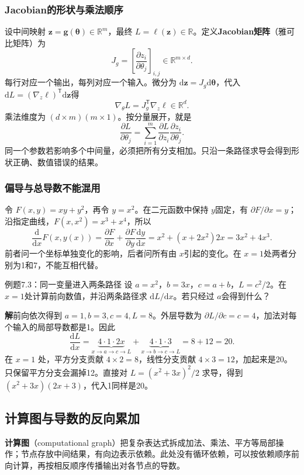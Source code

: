 \documentclass[UTF8,fontset=none,zihao=-4,a4paper]{ctexart}
\newcommand{\term}[1]{\textbf{#1}}
\newcommand{\sol}{\par\noindent\textbf{解}\quad}
\numberwithin{equation}{section}
\numberwithin{figure}{section}
\begin{document}
\subsubsection{Jacobian的形状与乘法顺序}
设中间映射 $\symbf z=\symbf g(\symbf\theta)\in\mathbb R^m$，最终 $L=\ell(\symbf z)\in\mathbb R$。定义\term{Jacobian矩阵}（雅可比矩阵）为
\[
 J_g=\left[\frac{\partial z_i}{\partial\theta_j}\right]_{i,j}
 \in\mathbb R^{m\times d}.
\]
每行对应一个输出，每列对应一个输入。微分为 $\mathrm d\symbf z=J_g\mathrm d\symbf\theta$，代入 $\mathrm dL=(\nabla_z\ell)^{\mathsf T}\mathrm d\symbf z$得
\begin{equation}\label{eq:chain-vector}
 \nabla_\theta L=J_g^{\mathsf T}\nabla_z\ell
 \in\mathbb R^d.
\end{equation}
乘法维度为 $(d\times m)(m\times1)$。按分量展开，就是
\[
 \frac{\partial L}{\partial\theta_j}
 =\sum_{i=1}^m\frac{\partial L}{\partial z_i}
                 \frac{\partial z_i}{\partial\theta_j}.
\]
同一个参数若影响多个中间量，必须把所有分支相加。只沿一条路径求导会得到形状正确、数值错误的结果。

\subsubsection{偏导与总导数不能混用}
令 $F(x,y)=xy+y^2$，再令 $y=x^2$。在二元函数中保持 $y$固定，有 $\partial F/\partial x=y$；沿指定曲线，$F(x,x^2)=x^3+x^4$，所以
\[
 \frac{\mathrm d}{\mathrm dx}F(x,y(x))
 =\frac{\partial F}{\partial x}+\frac{\partial F}{\partial y}\frac{\mathrm dy}{\mathrm dx}
 =x^2+(x+2x^2)2x=3x^2+4x^3.
\]
前者问一个坐标单独变化的影响，后者问所有由 $x$引起的变化。在 $x=1$处两者分别为1和7，不能互相代替。

\begin{infobox}{例题7.3：同一变量进入两条路径}
设 $a=x^2$，$b=3x$，$c=a+b$，$L=c^2/2$。在 $x=1$处计算前向数值，并沿两条路径求 $\mathrm dL/\mathrm dx$。若只经过 $a$会得到什么？
\end{infobox}
\sol 前向依次得到 $a=1,b=3,c=4,L=8$。外层导数为 $\partial L/\partial c=c=4$，加法对每个输入的局部导数都是1。因此
\[
 \frac{\mathrm dL}{\mathrm dx}
 =\underbrace{4\cdot1\cdot2x}_{x\to a\to c\to L}
 +\underbrace{4\cdot1\cdot3}_{x\to b\to c\to L}
 =8+12=20.
\]
在 $x=1$ 处，平方分支贡献 $4\times2=8$，线性分支贡献 $4\times3=12$，加起来是20。只保留平方分支会漏掉12。直接对 $L=(x^2+3x)^2/2$ 求导，得到 $(x^2+3x)(2x+3)$，代入1同样是20。

\subsection{计算图与导数的反向累加}
\term{计算图}（computational graph）把复杂表达式拆成加法、乘法、平方等局部操作；节点存放中间结果，有向边表示依赖。此处没有循环依赖，可以按依赖顺序前向计算，再按相反顺序传播输出对各节点的导数。
\end{document}
